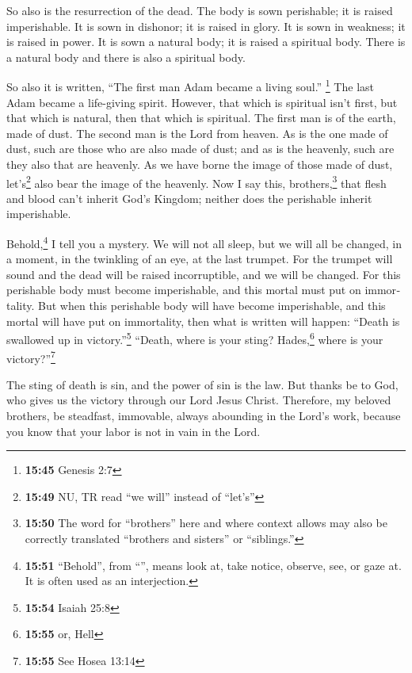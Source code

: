 \begin{paracol}{2}
\begin{otherlanguage}{english}
 So also is the resurrection of the dead. The body is
sown perishable; it is raised imperishable.  It is sown
in dishonor; it is raised in glory. It is sown in weakness; it is raised
in power.  It is sown a natural body; it is raised a
spiritual body. There is a natural body and there is also a spiritual
body.

 So also it is written, ``The first man Adam became a
living soul.'' \footnote{\textbf{15:45} Genesis 2:7} The last Adam
became a life-giving spirit.  However, that which is
spiritual isn't first, but that which is natural, then that which is
spiritual.  The first man is of the earth, made of dust.
The second man is the Lord from heaven.  As is the one
made of dust, such are those who are also made of dust; and as is the
heavenly, such are they also that are heavenly.  As we
have borne the image of those made of dust, let's\footnote{\textbf{15:49}
  NU, TR read ``we will'' instead of ``let's''} also bear the image of
the heavenly.  Now I say this, brothers,\footnote{\textbf{15:50}
  The word for ``brothers'' here and where context allows may also be
  correctly translated ``brothers and sisters'' or ``siblings.''} that
flesh and blood can't inherit God's Kingdom; neither does the perishable
inherit imperishable.

 Behold,\footnote{\textbf{15:51} ``Behold'', from
  ``'', means look at, take notice, observe, see, or gaze
  at. It is often used as an interjection.} I tell you a mystery. We
will not all sleep, but we will all be changed,  in a
moment, in the twinkling of an eye, at the last trumpet. For the trumpet
will sound and the dead will be raised incorruptible, and we will be
changed.  For this perishable body must become
imperishable, and this mortal must put on immortality. 
But when this perishable body will have become imperishable, and this
mortal will have put on immortality, then what is written will happen:
``Death is swallowed up in victory.''\footnote{\textbf{15:54} Isaiah
  25:8}  ``Death, where is your sting? Hades,\footnote{\textbf{15:55}
  or, Hell} where is your victory?''\footnote{\textbf{15:55} See Hosea
  13:14}

 The sting of death is sin, and the power of sin is the
law.  But thanks be to God, who gives us the victory
through our Lord Jesus Christ.  Therefore, my beloved
brothers, be steadfast, immovable, always abounding in the Lord's work,
because you know that your labor is not in vain in the Lord.


\end{otherlanguage}
\end{paracol}
